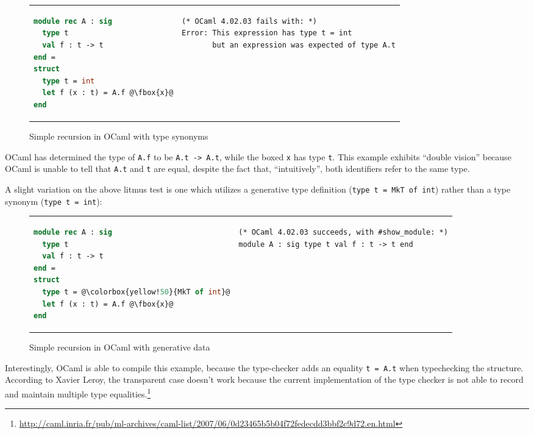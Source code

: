 \begin{figure}[H]
\begin{tabular}{p{} p{}}
\begin{lstlisting}[language=ML,escapechar=@]
module rec A : sig
  type t
  val f : t -> t
end =
struct
  type t = int
  let f (x : t) = A.f @\fbox{x}@
end
\end{lstlisting}
&
\begin{verbatim}
(* OCaml 4.02.03 fails with: *)
Error: This expression has type t = int
       but an expression was expected of type A.t
\end{verbatim}
\end{tabular}
\caption{Simple recursion in OCaml with type synonyms}
\label{fig:double-vision-simple-recursion-ocaml-synonym}
\end{figure}

\noindent
OCaml has determined the type of \verb|A.f| to be \verb|A.t -> A.t|,
while the boxed \verb|x| has type \verb|t|.  This example exhibits
``double vision'' because OCaml is unable to tell that \verb|A.t| and
\verb|t| are equal, despite the fact that, ``intuitively'', both identifiers refer to
the same type.

A slight variation on the above litmus test is one which utilizes a generative type
definition (\verb|type t = MkT of int|) rather than a type synonym (\verb|type t = int|):

\begin{figure}[H]
\begin{tabular}{p{} p{}}
\begin{lstlisting}[language=ML,escapechar=@]
module rec A : sig
  type t
  val f : t -> t
end =
struct
  type t = @\colorbox{yellow!50}{MkT of int}@
  let f (x : t) = A.f @\fbox{x}@
end
\end{lstlisting}
&
\begin{verbatim}
(* OCaml 4.02.03 succeeds, with #show_module: *)
module A : sig type t val f : t -> t end
\end{verbatim}
\end{tabular}
\caption{Simple recursion in OCaml with generative data}
\label{fig:double-vision-simple-recursion-ocaml-generative}
\end{figure}

\noindent
Interestingly, OCaml is able to compile this example, because the type-checker
adds an equality \verb|t = A.t| when typechecking the structure.
According to Xavier Leroy, the transparent case doesn't work because
the current implementation of the type checker is not able to
record and maintain multiple type equalities.\footnote{\url{http://caml.inria.fr/pub/ml-archives/caml-list/2007/06/0d23465b5b04f72fedecdd3bbf2c9d72.en.html}}

